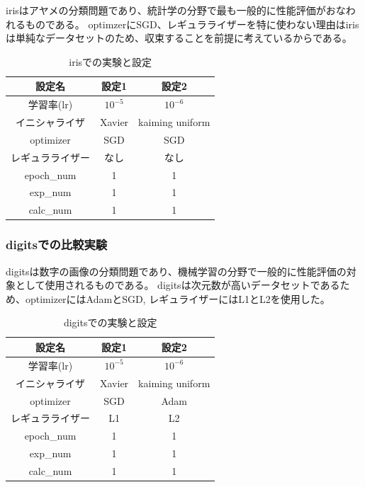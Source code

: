 irisはアヤメの分類問題であり、統計学の分野で最も一般的に性能評価がおなわれるものである。
optimzerにSGD、レギュラライザーを特に使わない理由はirisは単純なデータセットのため、収束することを前提に考えているからである。

\begin{table}[htbp]
    \begin{center}
        \caption{irisでの実験と設定}
        \vspace{5mm} 
        \begin{tabular}{ |c|c|c| }
        設定名 & 設定1 & 設定2 \\
        \hline
        学習率(lr)         & $ 10^{-5} $ & $ 10^{-6} $ \\
        イニシャライザ       & Xavier &  kaiming uniform \\
        optimizer           & SGD & SGD \\
        レギュラライザー     & なし & なし \\
        epoch\_num       & 1 &  1 \\
        exp\_num         & 1 & 1 \\
        calc\_num        & 1 & 1 \\
        \end{tabular}
    \end{center}
\end{table}



\subsubsection{digitsでの比較実験}
\label{impl:digits}

digitsは数字の画像の分類問題であり、機械学習の分野で一般的に性能評価の対象として使用されるものである。
digitsは次元数が高いデータセットであるため、optimizerにはAdamとSGD, レギュライザーにはL1とL2を使用した。

\begin{table}[htbp]
    \begin{center}
        \caption{digitsでの実験と設定}
        \vspace{5mm} 
        \begin{tabular}{ |c|c|c| }
        設定名 & 設定1 & 設定2 \\
        \hline
        学習率(lr)         & $ 10^{-5} $ & $ 10^{-6} $ \\
        イニシャライザ       & Xavier & kaiming uniform \\
        optimizer           & SGD & Adam \\
        レギュラライザー     & L1 & L2 \\
        epoch\_num       & 1 &  1 \\
        exp\_num         & 1 & 1 \\
        calc\_num        & 1 & 1 \\
        \end{tabular}
    \end{center}
\end{table}



